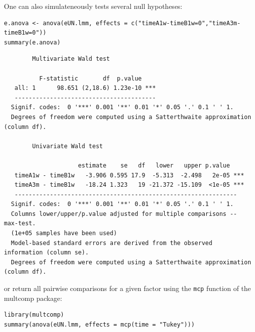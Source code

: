 \documentclass[12pt]{article}
\begin{document}
One can also simulateneously tests several null hypotheses:
\lstset{language=r,label= ,caption= ,captionpos=b,numbers=none}
\begin{lstlisting}
e.anova <- anova(eUN.lmm, effects = c("timeA1w-timeB1w=0","timeA3m-timeB1w=0"))
summary(e.anova)
\end{lstlisting}

\begin{verbatim}
		Multivariate Wald test 

          F-statistic       df  p.value    
   all: 1      98.651 (2,18.6) 1.23e-10 ***
   ---------------------------------------- 
  Signif. codes:  0 '***' 0.001 '**' 0.01 '*' 0.05 '.' 0.1 ' ' 1.
  Degrees of freedom were computed using a Satterthwaite approximation (column df). 

		Univariate Wald test 

                     estimate    se   df   lower   upper p.value    
   timeA1w - timeB1w   -3.906 0.595 17.9  -5.313  -2.498   2e-05 ***
   timeA3m - timeB1w   -18.24 1.323   19 -21.372 -15.109  <1e-05 ***
   --------------------------------------------------------------- 
  Signif. codes:  0 '***' 0.001 '**' 0.01 '*' 0.05 '.' 0.1 ' ' 1.
  Columns lower/upper/p.value adjusted for multiple comparisons -- max-test.
  (1e+05 samples have been used)
  Model-based standard errors are derived from the observed information (column se). 
  Degrees of freedom were computed using a Satterthwaite approximation (column df).
\end{verbatim}

\clearpage

or return all pairwise comparisons for a given factor using the \texttt{mcp}
function of the multcomp package:
\lstset{language=r,label= ,caption= ,captionpos=b,numbers=none}
\begin{lstlisting}
library(multcomp)
summary(anova(eUN.lmm, effects = mcp(time = "Tukey")))
\end{lstlisting}
\end{document}
